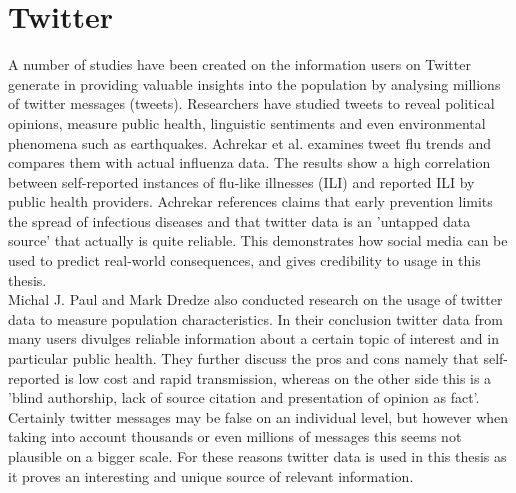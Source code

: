 \section{Twitter}
A number of studies have been created on the information users on Twitter generate in providing valuable insights into the population by analysing millions of twitter messages (tweets). Researchers have studied tweets to reveal political opinions\cite{twitter_politic}, measure public health\cite{twitter_flu_trends}, linguistic sentiments\cite{twitter_linguistics} and even environmental phenomena such as earthquakes\cite{twitter_earthQuake}. Achrekar et al.\cite{twitter_flu_trends} examines tweet flu trends and compares them with actual influenza data. The results show a high correlation between self-reported instances of flu-like illnesses (ILI) and reported ILI by public health providers. Achrekar references claims that early prevention limits the spread of infectious diseases and that twitter data is an 'untapped data source' that actually is quite reliable. This demonstrates how social media can be  used to predict real-world consequences, and gives credibility to usage in this thesis. \\Michal J. Paul and Mark Dredze \cite{twitter_what_you_tweet} also conducted research on the usage of twitter data to measure population characteristics. In their conclusion twitter data from many users divulges reliable information about a certain topic of interest and in particular public health. They further discuss the pros and cons namely that self-reported is low cost and rapid transmission, whereas on the other side this is a 'blind authorship, lack of source citation and presentation of opinion as fact'. Certainly twitter messages may be false on an individual level, but however when taking into account thousands or even millions of messages this seems not plausible on a bigger scale. For these reasons twitter data is used in this thesis as it proves an interesting and unique source of relevant information.